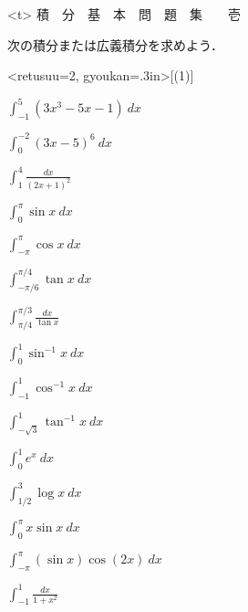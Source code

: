 \documentclass[11pt, uplatex, dvipdfmx]{jsarticle}
\newcommand{\ds}{\displaystyle}
\begin{document}
\thispagestyle{empty}


\begin{center}
  \pbox<t>{\Huge \hspace{1.5in} 積　分　基　本　問　題　集　　壱}
\end{center}

\newpage

次の積分または広義積分を求めよう．

  \vspace{.2in}

  \begin{edaenumerate}<retusuu=2, gyoukan=.3in>[(1)]
    
  \item $\ds \int_{-1}^{5} \left( 3x^3-5x-1 \right) \ dx$
    
  \item $\ds \int_{0}^{-2} \left( 3x-5 \right)^6 \ dx$
    
  \item $\ds \int_{1}^{4} \frac{dx}{(2x+1)^2}$
    
  \item $\ds \int_{0}^{\pi} \sin x \ dx$
    
  \item $\ds \int_{-\pi}^{\pi} \cos x \ dx$

  \item $\ds \int_{-\pi /6}^{\pi /4} \tan x \ dx$

  \item $\ds \int_{\pi/4}^{\pi/3} \frac{dx}{\tan x}$

  \item $\ds \int_{0}^{1} \sin^{-1}x \ dx$

  \item $\ds \int_{-1}^{1} \cos^{-1}x \ dx$

  \item $\ds \int_{-\sqrt{3}}^{1} \tan^{-1}x \ dx$

  \item $\ds \int_0^1 e^x \ dx$

  \item $\ds \int_{1/2}^{3} \log x \ dx$

  \item $\ds \int_{0}^{\pi} x \sin x \ dx$

  \item $\ds \int_{-\pi}^{\pi} \left(\sin x\right) \cos \left(2x \right)\ dx$

  \item $\ds \int_{-1}^{1} \frac{dx}{1+x^2}$


\end{edaenumerate}
\end{document}
